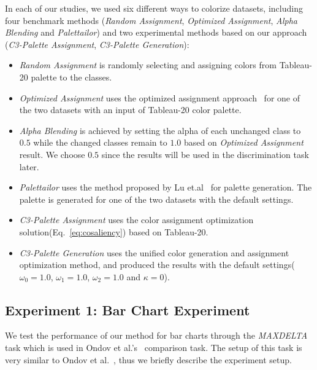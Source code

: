 \vspace{.3em}
 In each of our studies, we used six different ways to colorize datasets, including four benchmark methods (\emph{Random Assignment}, \emph{Optimized Assignment}, \emph{Alpha Blending} and \emph{Palettailor}) and two experimental methods based on our approach (\emph{C3-Palette Assignment}, \emph{C3-Palette Generation}):
\begin{itemize}
     \item \emph{Random Assignment} is randomly selecting and assigning colors from Tableau-20 palette to the classes.
     \item \emph{Optimized Assignment} uses the optimized assignment approach~\cite{Wang2018} for one of the two datasets with an input of Tableau-20 color palette.
     \item \emph{Alpha Blending} is achieved by setting the alpha of each unchanged class to $0.5$ while the changed classes remain to $1.0$ based on \emph{Optimized Assignment} result. We choose $0.5$ since the results will be used in the discrimination task later.
     \item \emph{Palettailor} uses the method proposed by Lu et.al~\cite{Lu21} for palette generation. The palette is generated for one of the two datasets with the default settings.
     \item \emph{C3-Palette Assignment} uses the color assignment optimization solution(Eq.~\ref{eq:cosaliency}) based on Tableau-20.
     \item \emph{C3-Palette Generation} uses the unified color generation and assignment optimization method, and produced the results with the default settings($\omega_0=1.0$, $\omega_1=1.0$, $\omega_2=1.0$ and $\kappa=0$).
\end{itemize}

\subsection{Experiment 1: Bar Chart Experiment}
\label{subsec:barchartExp}
We test the performance of our method for bar charts through the \emph{MAXDELTA} task which is used in Ondov et al.'s~\cite{Ondov19} comparison task. The setup of this task is very similar to Ondov et al.~\cite{Ondov19}, thus we briefly describe the experiment setup.
